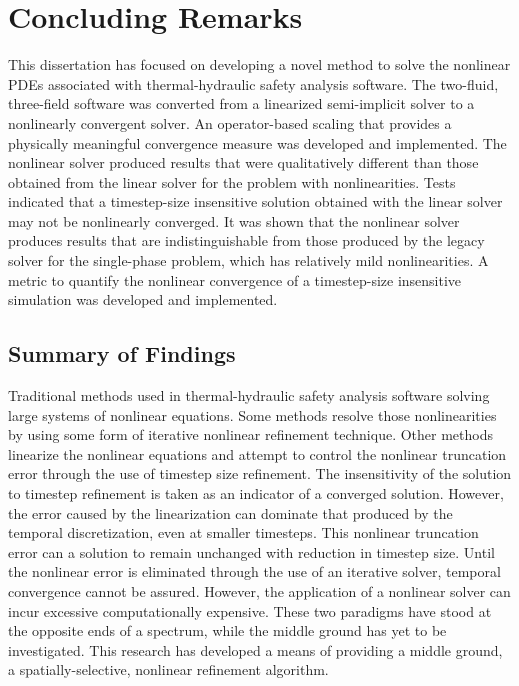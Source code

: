 \chapter{Concluding Remarks}
\label{chap:end}
This dissertation has focused on developing a novel method to solve the nonlinear PDEs associated with thermal-hydraulic safety analysis software.
The two-fluid, three-field software \cobra{} was converted from a linearized semi-implicit solver to a nonlinearly convergent solver.
An operator-based scaling that provides a physically meaningful convergence measure was developed and implemented.
The nonlinear solver produced results that were qualitatively different than those obtained from the linear solver for the problem with nonlinearities.
Tests indicated that a timestep-size insensitive solution obtained with the linear solver may not be nonlinearly converged.
It was shown that the nonlinear solver produces results that are indistinguishable from those produced by the legacy solver for the single-phase problem, which has relatively mild nonlinearities.
A metric to quantify the nonlinear convergence of a timestep-size insensitive simulation was developed and implemented.

\section{Summary of Findings}
\label{sect:end:summary}
Traditional methods used in thermal-hydraulic safety analysis software solving large systems of nonlinear equations.
Some methods resolve those nonlinearities by using some form of iterative nonlinear refinement technique.
Other methods linearize the nonlinear equations and attempt to control the nonlinear truncation error through the use of timestep size refinement.
The insensitivity of the solution to timestep refinement is taken as an indicator of a converged solution. 
However, the error caused by the linearization can dominate that produced by the temporal discretization, even at smaller timesteps.
This nonlinear truncation error can a solution to remain unchanged with reduction in timestep size.
Until the nonlinear error is eliminated through the use of an iterative solver, temporal convergence cannot be assured.
However, the application of a nonlinear solver can incur excessive computationally expensive.
These two paradigms have stood at the opposite ends of a spectrum, while the middle ground has yet to be investigated.
This research has developed a means of providing a middle ground, a spatially-selective, nonlinear refinement algorithm.

